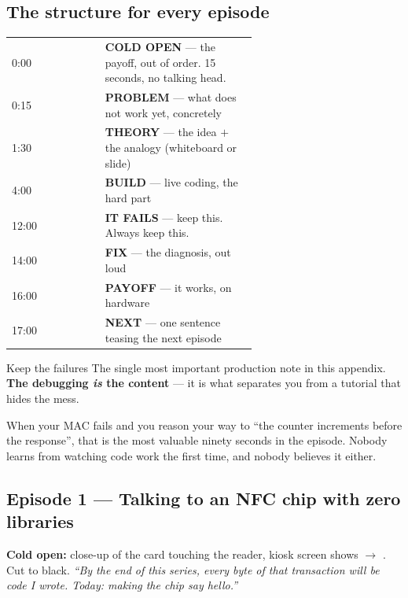 \subsection{The structure for every episode}

\begin{center}\small
\begin{tabular}{@{}lL{0.62\linewidth}@{}}
\toprule
{} &  \\
:00  & \textbf{COLD OPEN} --- the payoff, out of order. 15 seconds, no talking head. \\
0:15  & \textbf{PROBLEM} --- what does not work yet, concretely \\
1:30  & \textbf{THEORY} --- the idea $+$ the analogy (whiteboard or slide) \\
4:00  & \textbf{BUILD} --- live coding, the hard part \\
12:00 & \textbf{IT FAILS} --- keep this. Always keep this. \\
14:00 & \textbf{FIX} --- the diagnosis, out loud \\
16:00 & \textbf{PAYOFF} --- it works, on hardware \\
17:00 & \textbf{NEXT} --- one sentence teasing the next episode \\
\bottomrule
\end{tabular}
\end{center}

\begin{concept}{Keep the failures}
The single most important production note in this appendix. \textbf{The
debugging \emph{is} the content} --- it is what separates you from a tutorial
that hides the mess.

When your MAC fails and you reason your way to ``the counter increments before
the response'', that is the most valuable ninety seconds in the episode. Nobody
learns from watching code work the first time, and nobody believes it either.
\end{concept}

\subsection{Episode 1 --- Talking to an NFC chip with zero libraries}

\textbf{Cold open:} close-up of the card touching the reader, kiosk screen shows
 $\rightarrow$ . Cut to black. \emph{``By the end of
this series, every byte of that transaction will be code I wrote. Today: making
the chip say hello.''}

